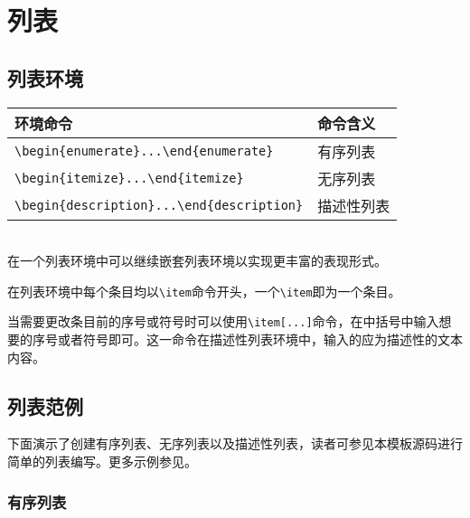 {\begin{longtable}{ccccccccc}
  \end{longtable}
}

\section{列表}

\subsection{列表环境}

\begin{tabular}[htb]{l l}
\toprule
环境命令 & 命令含义\\
\midrule
\verb|\begin{enumerate}...\end{enumerate}| & 有序列表 \\
\verb|\begin{itemize}...\end{itemize}| & 无序列表 \\
\verb|\begin{description}...\end{description}| & 描述性列表 \\
\bottomrule
\end{tabular}\\

在一个列表环境中可以继续嵌套列表环境以实现更丰富的表现形式。

在列表环境中每个条目均以\verb|\item|命令开头，一个\verb|\item|即为一个条目。

当需要更改条目前的序号或符号时可以使用\verb|\item[...]|命令，在中括号中输入想要的序号或者符号即可。这一命令在描述性列表环境中，输入的应为描述性的文本内容。

\subsection{列表范例}

下面演示了创建有序列表、无序列表以及描述性列表，读者可参见本模板源码进行简单的列表编写。更多示例参见。

\subsubsection{有序列表}

